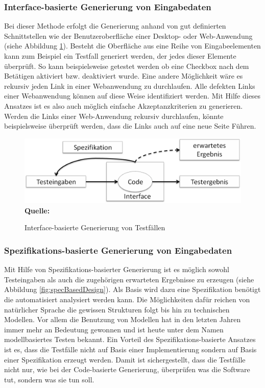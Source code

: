 \subsubsection{Interface-basierte Generierung von Eingabedaten}
\label{subsubsec:interfacebasierte_generierung}
Bei dieser Methode erfolgt die Generierung anhand von gut definierten Schnittstellen wie  der Benutzeroberfläche einer Desktop- oder Web-Anwendung (siehe Abbildung \ref{fig:interfaceBasedDesign}). 
Besteht die Oberfläche aus eine Reihe von Eingabeelementen kann zum Beispiel ein Testfall generiert werden, der jedes dieser Elemente überprüft. So kann beispielsweise getestet werden ob eine Checkbox nach dem Betätigen aktiviert bzw. deaktiviert wurde. Eine andere Möglichkeit wäre es rekursiv jeden Link in einer Webanwendung zu durchlaufen. Alle defekten Links einer Webanwendung können auf diese Weise identifiziert werden.
Mit Hilfe dieses Ansatzes ist es also auch möglich einfache Akzeptanzkriterien zu generieren. Werden die Links einer Web-Anwendung rekursiv durchlaufen, könnte beispielsweise überprüft werden, dass die Links auch auf eine neue Seite Führen. \cite[vgl. S. 20,21]{fewster_software_1999}

\begin{figure}[htb]
  \centering  
  \includegraphics[scale=0.6]{img/interfaceBasedDesign.png}\\
  \footnotesize\sffamily\textbf{Quelle:} \cite[vgl. S. 20]{fewster_software_1999}
  \caption{Interface-basierte Generierung von Testfällen}
  \label{fig:interfaceBasedDesign}
\end{figure}


\subsubsection{Spezifikations-basierte Generierung von Eingabedaten}
\label{subsubsec:spezifikationsbasierte_generierung}
Mit Hilfe von Spezifikations-basierter Generierung ist es möglich sowohl Testeingaben als auch die zugehörigen erwarteten Ergebnisse zu erzeugen (siehe Abbildung \ref{fig:specBasedDesign}). Als Basis wird dazu eine Spezifikation benötigt die automatisiert analysiert werden kann. Die Möglichkeiten dafür reichen von natürlicher Sprache die gewissen Strukturen folgt bis hin zu technischen Modellen. Vor allem die Benutzung von Modellen hat in den letzten Jahren immer mehr an Bedeutung gewonnen und ist heute unter dem Namen modellbasiertes Testen bekannt. \cite{rossner_basiswissen_2010}
Ein Vorteil des Spezifikations-basierte Ansatzes ist es, dass die Testfälle nicht auf Basis einer Implementierung sondern auf Basis einer Spezifikation erzeugt werden. Damit ist sichergestellt, dass die Testfälle nicht nur, wie bei der Code-basierte Generierung, überprüfen \grq was die Software tut\grq , sondern \grq was sie tun soll\grq. \cite[vgl. S. 21]{fewster_software_1999}

